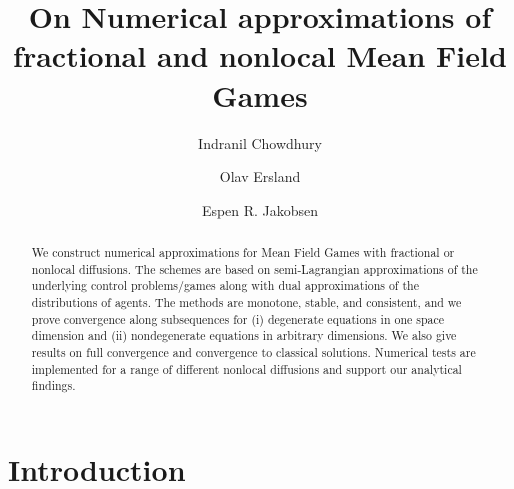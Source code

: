 \documentclass[a4paper,  twoside, 10pt, leqno]{amsart}
\title[Approximation of nonlocal MFGs]{
 On Numerical approximations  of fractional and nonlocal Mean Field Games}
\author[I. Chowdhury]{Indranil Chowdhury}
\author[O. Ersland]{Olav Ersland}
\author[E.~R. Jakobsen]{Espen R. Jakobsen}
\theoremstyle{remark}
\theoremstyle{definition}
\begin{document}
  





\begin{abstract}
We construct numerical approximations for Mean Field Games with
fractional or nonlocal diffusions. The schemes are based on
semi-Lagrangian approximations of the underlying control
problems/games along with dual approximations of the
distributions of agents. The methods are monotone, stable, and consistent,  and we prove 
convergence along subsequences for  (i) degenerate
equations in one space dimension
and (ii) nondegenerate equations in arbitrary
dimensions. We also give results on full convergence and
convergence to classical solutions.
Numerical tests are implemented
for a range of different nonlocal diffusions and support our analytical findings.
\end{abstract}
\maketitle  
\tableofcontents

\section{Introduction}
\end{document}

